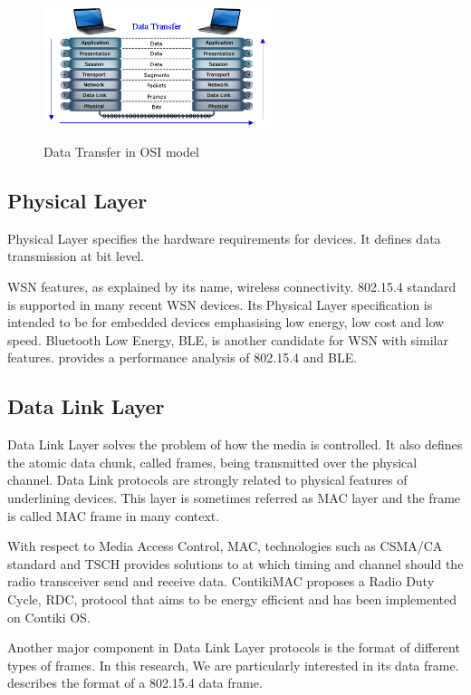 \begin{figure}
\centering
{
	\includegraphics[width=0.6\textwidth,]{fig/Osi-model.png}
}
\caption{Data Transfer in OSI model} \label{fig: OSI channel}
\end{figure}

\subsection{Physical Layer}
Physical Layer specifies the hardware requirements for devices. It defines data transmission at bit level.

WSN features, as explained by its name, wireless connectivity. 802.15.4\cite{802154} standard is supported in many recent WSN devices. Its Physical Layer specification is intended to be for embedded devices emphasising low energy, low cost and low speed. Bluetooth Low Energy, BLE, is another candidate for WSN with similar features. \cite{802154BLE} provides a performance analysis of 802.15.4 and BLE.

\subsection{Data Link Layer}
Data Link Layer solves the problem of how the media is controlled. It also defines the atomic data chunk, called frames, being transmitted over the physical channel. Data Link protocols are strongly related to physical features of underlining devices. This layer is sometimes referred as MAC layer and the frame is called MAC frame in many context.

With respect to Media Access Control, MAC, technologies such as CSMA/CA \cite{802154} standard and TSCH\cite{TSCH} provides solutions to at which timing and channel should the radio transceiver send and receive data. ContikiMAC\cite{ContikiMAC} proposes a Radio Duty Cycle, RDC, protocol that aims to be energy efficient and has been implemented on Contiki OS.

Another major component in Data Link Layer protocols is the format of different types of frames. In this research, We are particularly interested in its data frame.  describes the format of a 802.15.4 data frame.

